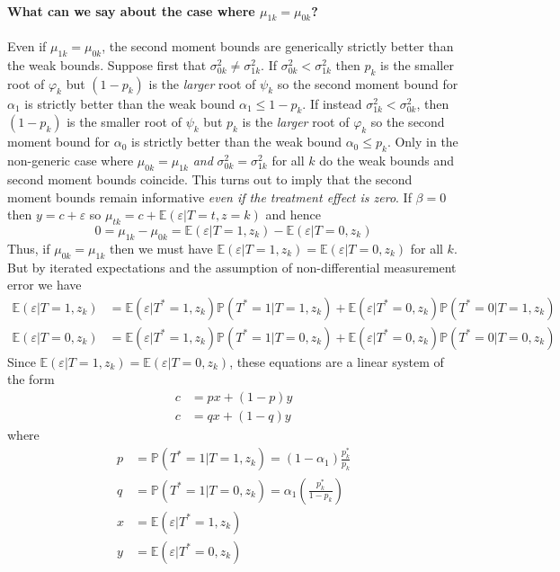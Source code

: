 \documentclass[12pt]{article}
\begin{document}
\paragraph{What can we say about the case where $\mu_{1k} = \mu_{0k}$?}
Even if $\mu_{1k} = \mu_{0k}$, the second moment bounds are generically strictly better than the weak bounds.
Suppose first that $\sigma_{0k}^2 \neq \sigma_{1k}^2$.
If $\sigma_{0k}^2 < \sigma_{1k}^2$ then $p_k$ is the smaller root of $\varphi_k$ but $(1 - p_k)$ is the \emph{larger} root of $\psi_k$ so the second moment bound for $\alpha_1$ is strictly better than the weak bound $\alpha_1 \leq 1 - p_k$.
If instead $\sigma_{1k}^2 < \sigma_{0k}^2$, then $(1 - p_k)$ is the smaller root of $\psi_k$ but $p_k$ is the \emph{larger} root of $\varphi_k$ so the second moment bound for $\alpha_0$ is strictly better than the weak bound $\alpha_0 \leq p_k$.
Only in the non-generic case where $\mu_{0k} = \mu_{1k}$ \emph{and} $\sigma^2_{0k} = \sigma_{1k}^2$ for all $k$ do the weak bounds and second moment bounds coincide.
This turns out to imply that the second moment bounds remain informative \emph{even if the treatment effect is zero}.
If $\beta = 0$ then $y = c + \varepsilon$ so $\mu_{tk} = c + \mathbb{E}(\varepsilon|T=t,z=k)$ and hence
\[
  0 = \mu_{1k} - \mu_{0k} = \mathbb{E}(\varepsilon|T=1,z_k) - \mathbb{E}(\varepsilon|T=0,z_k)
\]
Thus, if $\mu_{0k} = \mu_{1k}$ then we must have $\mathbb{E}(\varepsilon|T=1,z_k) = \mathbb{E}(\varepsilon|T=0,z_k)$ for all $k$.
But by iterated expectations and the assumption of non-differential measurement error we have
\begin{align*}
  \mathbb{E}(\varepsilon|T=1, z_k) &= \mathbb{E}(\varepsilon|T^*=1,z_k)\mathbb{P}(T^*=1|T=1,z_k) + \mathbb{E}(\varepsilon|T^*=0,z_k)\mathbb{P}(T^*=0|T=1,z_k)\\
  \mathbb{E}(\varepsilon|T=0, z_k) &= \mathbb{E}(\varepsilon|T^*=1,z_k)\mathbb{P}(T^*=1|T=0,z_k) + \mathbb{E}(\varepsilon|T^*=0,z_k)\mathbb{P}(T^*=0|T=0,z_k)
\end{align*}
Since $\mathbb{E}(\varepsilon|T=1,z_k) = \mathbb{E}(\varepsilon|T=0,z_k)$, these equations are a linear system of the form
\begin{align*}
  c &= p x + (1 - p)y\\
  c &= q x + (1 - q)y
\end{align*}
where 
\begin{align*}
  p &= \mathbb{P}(T^*=1|T=1,z_k) = (1 - \alpha_1) \frac{p_k^*}{p_k}\\
  q &= \mathbb{P}(T^*=1|T=0,z_k) = \alpha_1 \left(\frac{p_k^*}{1 - p_k}\right)\\
  x &= \mathbb{E}(\varepsilon|T^*=1,z_k)\\
  y &= \mathbb{E}(\varepsilon|T^*=0,z_k)
\end{align*}
\end{document}
